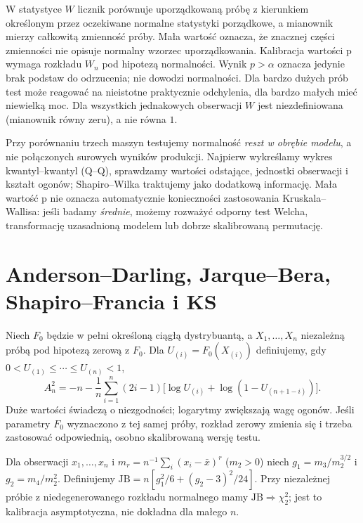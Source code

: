 \begin{uwaga}
W statystyce $W$ licznik porównuje uporządkowaną próbę z kierunkiem określonym przez oczekiwane normalne statystyki porządkowe, a mianownik mierzy całkowitą zmienność próby. Mała wartość oznacza, że znacznej części zmienności nie opisuje normalny wzorzec uporządkowania. Kalibracja wartości p wymaga rozkładu $W_n$ pod hipotezą normalności. Wynik $p>\alpha$ oznacza jedynie brak podstaw do odrzucenia; nie dowodzi normalności. Dla bardzo dużych prób test może reagować na nieistotne praktycznie odchylenia, dla bardzo małych mieć niewielką moc. Dla wszystkich jednakowych obserwacji $W$ jest niezdefiniowana (mianownik równy zeru), a nie równa $1$.
\end{uwaga}

\begin{przyklad}
Przy porównaniu trzech maszyn testujemy normalność \emph{reszt w obrębie modelu}, a nie połączonych surowych wyników produkcji. Najpierw wykreślamy wykres kwantyl--kwantyl (Q--Q), sprawdzamy wartości odstające, jednostki obserwacji i kształt ogonów; Shapiro--Wilka traktujemy jako dodatkową informację. Mała wartość p nie oznacza automatycznie konieczności zastosowania Kruskala--Wallisa: jeśli badamy \emph{średnie}, możemy rozważyć odporny test Welcha, transformację uzasadnioną modelem lub dobrze skalibrowaną permutację.
\end{przyklad}

\section{Anderson--Darling, Jarque--Bera, Shapiro--Francia i KS}
\begin{definicja}\label{def:ad}
Niech $F_0$ będzie w pełni określoną ciągłą dystrybuantą, a $X_1,\ldots,X_n$ niezależną próbą pod hipotezą zerową z $F_0$. Dla $U_{(i)}=F_0(X_{(i)})$ definiujemy, gdy $0<U_{(1)}\le\cdots\le U_{(n)}<1$,
\[
 A_n^2=-n-\frac1n\sum_{i=1}^n(2i-1)\bigl[\log U_{(i)}+\log(1-U_{(n+1-i)})\bigr].
\]
Duże wartości świadczą o niezgodności; logarytmy zwiększają wagę ogonów. Jeśli parametry $F_0$ wyznaczono z tej samej próby, rozkład zerowy zmienia się i trzeba zastosować odpowiednią, osobno skalibrowaną wersję testu.
\end{definicja}

\begin{definicja}\label{def:jarque-bera}
Dla obserwacji $x_1,\ldots,x_n$ i $m_r=n^{-1}\sum_i(x_i-\bar x)^r$ ($m_2>0$) niech $g_1=m_3/m_2^{3/2}$ i $g_2=m_4/m_2^2$. Definiujemy $\mathrm{JB}=n[g_1^2/6+(g_2-3)^2/24]$. Przy niezależnej próbie z niedegenerowanego rozkładu normalnego mamy $\mathrm{JB}\Rightarrow\chi^2_2$; jest to kalibracja asymptotyczna, nie dokładna dla małego $n$.
\end{definicja}

